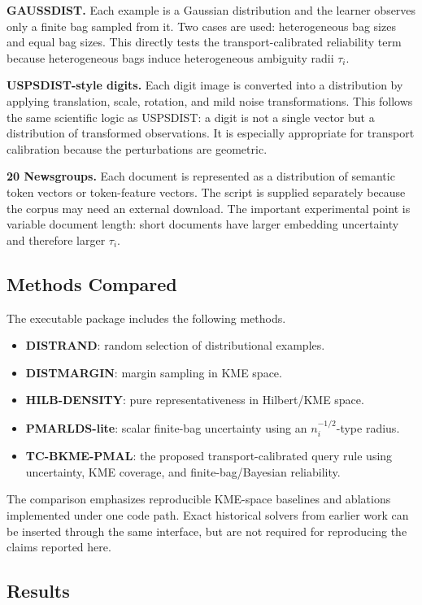 \documentclass[10pt,journal]{IEEEtran}
\begin{document}
\textbf{GAUSSDIST.} Each example is a Gaussian distribution and the learner observes only a finite bag sampled from it. Two cases are used: heterogeneous bag sizes and equal bag sizes. This directly tests the transport-calibrated reliability term because heterogeneous bags induce heterogeneous ambiguity radii $\tau_i$.

\textbf{USPSDIST-style digits.} Each digit image is converted into a distribution by applying translation, scale, rotation, and mild noise transformations. This follows the same scientific logic as USPSDIST: a digit is not a single vector but a distribution of transformed observations. It is especially appropriate for transport calibration because the perturbations are geometric.

\textbf{20 Newsgroups.} Each document is represented as a distribution of semantic token vectors or token-feature vectors. The script is supplied separately because the corpus may need an external download. The important experimental point is variable document length: short documents have larger embedding uncertainty and therefore larger $\tau_i$.

\subsection{Methods Compared}

The executable package includes the following methods.
\begin{itemize}[leftmargin=1.1em]
\item \textbf{DISTRAND}: random selection of distributional examples.
\item \textbf{DISTMARGIN}: margin sampling in KME space.
\item \textbf{HILB-DENSITY}: pure representativeness in Hilbert/KME space.
\item \textbf{PMARLDS-lite}: scalar finite-bag uncertainty using an $n_i^{-1/2}$-type radius.
\item \textbf{TC-BKME-PMAL}: the proposed transport-calibrated query rule using uncertainty, KME coverage, and finite-bag/Bayesian reliability.
\end{itemize}
The comparison emphasizes reproducible KME-space baselines and ablations implemented under one code path. Exact historical solvers from earlier work can be inserted through the same interface, but are not required for reproducing the claims reported here.

\subsection{Results}
\end{document}
